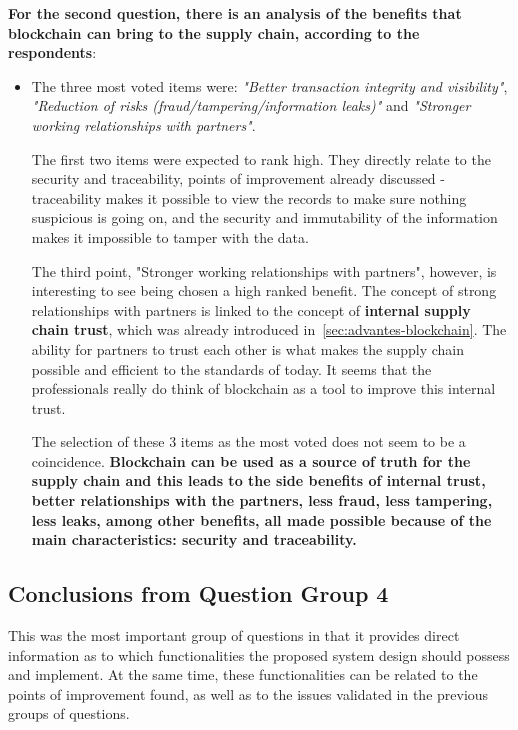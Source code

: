 \textbf{For the second question, there is an analysis of the benefits that blockchain can bring to the supply chain, according to the respondents}:

\begin{itemize}
    \item The three most voted items were: \textit{"Better transaction integrity and visibility"}, \textit{"Reduction of risks (fraud/tampering/information leaks)"} and \textit{"Stronger working relationships with partners"}.

    The first two items were expected to rank high. They directly relate to the security and traceability, points of improvement already discussed - traceability makes it possible to view the records to make sure nothing suspicious is going on, and the security and immutability of the information makes it impossible to tamper with the data.
    
    The third point, "Stronger working relationships with partners", however, is interesting to see being chosen a high ranked benefit. The concept of strong relationships with partners is linked to  the concept of \textbf{internal supply chain trust}, which was already introduced in~\ref{sec:advantes-blockchain}. The ability for partners to trust each other is what makes the supply chain possible and efficient to the standards of today. It seems that the professionals really do think of blockchain as a tool to improve this internal trust.
    
    The selection of these 3 items as the most voted does not seem to be a coincidence. \textbf{Blockchain can be used as a source of truth for the supply chain and this leads to the side benefits of internal trust, better relationships with the partners, less fraud, less tampering, less leaks, among other benefits, all made possible because of the main characteristics: security and traceability.}
\end{itemize}

\subsection*{Conclusions from Question Group 4}

This was the most important group of questions in that it provides direct information as to which functionalities the proposed system design should possess and implement. At the same time, these functionalities can be related to the points of improvement found, as well as to the issues validated in the previous groups of questions.

